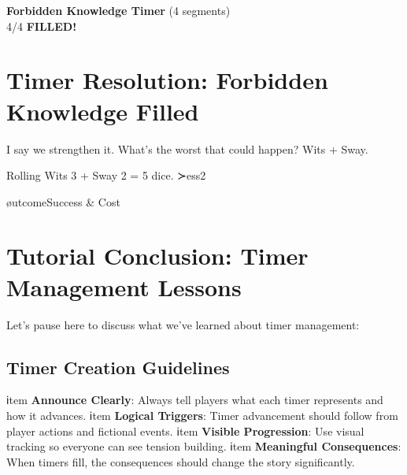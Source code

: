 \documentclass[11pt]{article}
\begin{document}

\begin{center}
\textbf{Forbidden Knowledge Timer } (4 segments)\\
\fbox{\textcolor{timercolor}{\timersegment\timersegment\timersegment\timersegment}} 4/4 \textbf{FILLED!}
\end{center}

\section*{Timer Resolution: Forbidden Knowledge Filled}


 I say we strengthen it. What's the worst that could happen? Wits + Sway.


 Rolling Wits 3 + Sway 2 = 5 dice.  ≻ess{2} 

øutcome{Success & Cost}


\section*{Tutorial Conclusion: Timer Management Lessons}

 Let's pause here to discuss what we've learned about timer management:

\subsection*{Timer Creation Guidelines}

\begin{enumerate}[leftmargin=*]
ℹtem \textbf{Announce Clearly}: Always tell players what each timer represents and how it advances.
ℹtem \textbf{Logical Triggers}: Timer advancement should follow from player actions and fictional events.
ℹtem \textbf{Visible Progression}: Use visual tracking so everyone can see tension building.
ℹtem \textbf{Meaningful Consequences}: When timers fill, the consequences should change the story significantly.
\end{enumerate}
\end{document}
